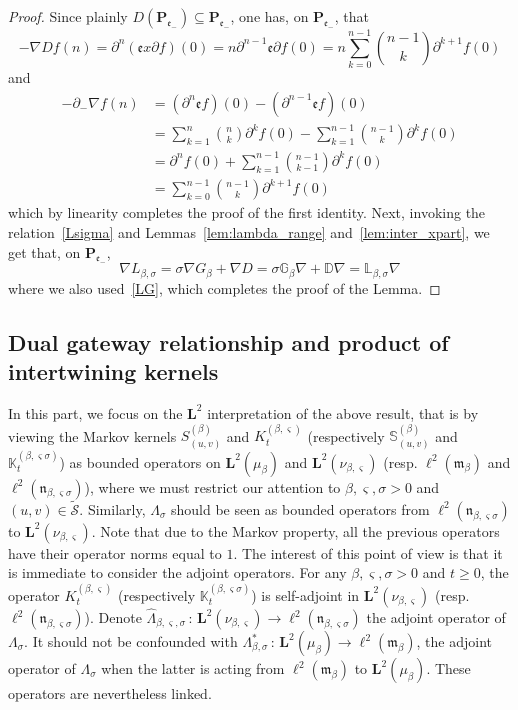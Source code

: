 \documentclass[AHL,Unicode,longabstracts]{cedram}
\newcommand{\cS}{{\mathcal S}}
\newcommand{\fe}{\mathfrak{e}}
\newcommand{\fm}{\mathfrak{m}}
\newcommand{\fn}{\mathfrak{n}}
\newcommand{\na}{\nabla}
\newcommand{\ri}{\rightarrow}
\newcommand{\wi}{\widetilde}
\newcommand{\wit}{\widehat}
\newcommand{\st}{\,:\,}
\newcommand{\dLs}{{\discret{K}}}
\newcommand{\esP}{\mathbf{P}}
\newcommand{\esL}{\mathbf{L}}
\newcommand{\esLd}{\ell}
\newcommand{\discret}[1]{\mathds{#1}}
\newcommand{\cont}[1]{{#1}}
\begin{document}
\begin{proof}
Since plainly $ D(\esP_{\fe_{-}})\subseteq \esP_{\fe_{-}}$, one has, on $\esP_{\fe_{-}}$, that
\[
-\na D f(n) = \partial^n(\fe x\partial f)(0) = n\partial^{n-1}\fe \partial f(0) =n \sum_{k=0}^{n-1} \binom{n-1}{k}\partial^{k+1}f(0)
\]
and
\begin{align*}
-\partial_-\na f(n) &= (\partial^{n}\fe f)(0)-(\partial^{n-1}\fe f)(0)\\
&=
\sum_{k=1}^{n} \binom{n}{k}\partial^{k}f(0)-\sum_{k=1}^{n-1} \binom{n-1}{k}\partial^{k}f(0)\\
&= \partial^{n}f(0) + \sum_{k=1}^{n-1} \binom{n-1}{k-1}\partial^{k}f(0)\\
&= \sum_{k=0}^{n-1} \binom{n-1}{k}\partial^{k+1}f(0)
\end{align*}
which by linearity completes the proof of the first identity. Next, invoking the relation~\eqref{Lsigma} and Lemmas~\ref{lem:lambda_range} and~\ref{lem:inter_xpart}, we get that, on $\esP_{\fe_{-}}$,
\begin{equation*}
\na \cont{L}_{\beta,\sigma} = \sigma \na \cont{G}_{\beta}+ \na D = \sigma \discret{G}_{\beta} \na + \discret{D}\na = \discret{L}_{\beta,\sigma} \na
\end{equation*}
where we also used~\eqref{LG}, which completes the proof of the Lemma.
\end{proof}

\subsection{Dual gateway relationship and product of intertwining kernels}

In this part, we focus on the $\esL^2$ interpretation of the above result, that is by viewing the Markov kernels $S_{(u,v)}^{(\beta)}$ and $K_t^{(\beta,\varsigma)}$ (respectively $\discret{S}_{(u,v)}^{(\beta)}$ and $\dLs_t^{(\beta,\varsigma\sigma)}$) as bounded operators on $\esL^2(\mu_\beta)$ and $\esL^2(\nu_{\beta,\varsigma})$ (resp. $\esLd^2(\fm_{\beta})$ and $\esLd^2(\fn_{\beta,\varsigma\sigma})$), where we must restrict our attention to $\beta,\varsigma,\sigma >0$ and $(u,v)\in\wi \cS$. Similarly, $\Lambda_\sigma$ should be seen as bounded operators from $\esLd^2(\fn_{\beta,\varsigma\sigma})$ to $\esL^2(\nu_{\beta,\varsigma})$. Note that due to the Markov property, all the previous operators have their operator norms equal to $1$. The interest of this point of view is that it is immediate to consider the adjoint operators. For any $\beta,\varsigma,\sigma>0$ and $ t\geq 0$, the operator $K_t^{(\beta,\varsigma)}$ (respectively $\dLs_t^{(\beta,\varsigma\sigma)}$) is self-adjoint in $\esL^2(\nu_{\beta,\varsigma})$ (resp. $\esLd^2(\fn_{\beta,\varsigma\sigma})$). Denote $\wit \Lambda_{\beta,\varsigma,\sigma}\st \esL^2(\nu_{\beta,\varsigma})\ri \esLd^2(\fn_{\beta,\varsigma\sigma})$ the adjoint operator of $\Lambda_\sigma$. It should not be confounded with $\Lambda_{\beta,\sigma}^{*}\st \esL^2(\mu_{\beta})\ri \esLd^2(\fm_{\beta})$, the adjoint operator of $\Lambda_\sigma$ when the latter is acting from $\esLd^2(\fm_{\beta})$ to $\esL^2(\mu_{\beta})$. These operators are nevertheless linked.
\end{document}
